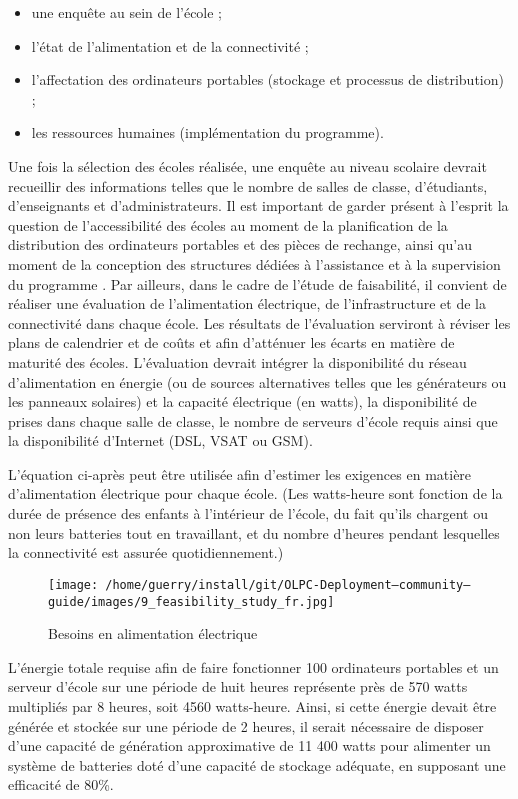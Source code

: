 \documentclass[11pt]{article}
\begin{document}
\begin{itemize}
\item une enquête au sein de l'école ;
\item l'état de l'alimentation et de la connectivité ;
\item l'affectation des ordinateurs portables (stockage et processus de
  distribution) ;
\item les ressources humaines (implémentation du programme).
\end{itemize}

Une fois la sélection des écoles réalisée, une enquête au niveau scolaire
devrait recueillir des informations telles que le nombre de salles de
classe, d'étudiants, d'enseignants et d'administrateurs. Il est important
de garder présent à l'esprit la question de l'accessibilité des écoles au
moment de la planification de la distribution des ordinateurs portables et
des pièces de rechange, ainsi qu'au moment de la conception des structures
dédiées à l'assistance et à la supervision du programme . Par ailleurs,
dans le cadre de l'étude de faisabilité, il convient de réaliser une
évaluation de l'alimentation électrique, de l'infrastructure et de la
connectivité dans chaque école. Les résultats de l'évaluation serviront à
réviser les plans de calendrier et de coûts et afin d'atténuer les écarts
en matière de maturité des écoles. L'évaluation devrait intégrer la
disponibilité du réseau d'alimentation en énergie (ou de sources
alternatives telles que les générateurs ou les panneaux solaires) et la
capacité électrique (en watts), la disponibilité de prises dans chaque
salle de classe, le nombre de serveurs d'école requis ainsi que la
disponibilité d'Internet (DSL, VSAT ou GSM).

L'équation ci-après peut être utilisée afin d'estimer les exigences en
matière d'alimentation électrique pour chaque école. (Les watts-heure sont
fonction de la durée de présence des enfants à l'intérieur de l'école, du
fait qu'ils chargent ou non leurs batteries tout en travaillant, et du
nombre d'heures pendant lesquelles la connectivité est assurée
quotidiennement.)

\begin{figure}[htb]
\centering
\texttt{[image: /home/guerry/install/git/OLPC-Deployment--community--guide/images/9\_feasibility\_study\_fr.jpg]}
\caption{Besoins en alimentation électrique}
\end{figure}

L'énergie totale requise afin de faire fonctionner 100 ordinateurs
portables et un serveur d'école sur une période de huit heures représente
près de 570 watts multipliés par 8 heures, soit 4560 watts-heure. Ainsi, si
cette énergie devait être générée et stockée sur une période de 2 heures,
il serait nécessaire de disposer d'une capacité de génération approximative
de 11 400 watts pour alimenter un système de batteries doté d'une capacité
de stockage adéquate, en supposant une efficacité de 80\%.
\end{document}
